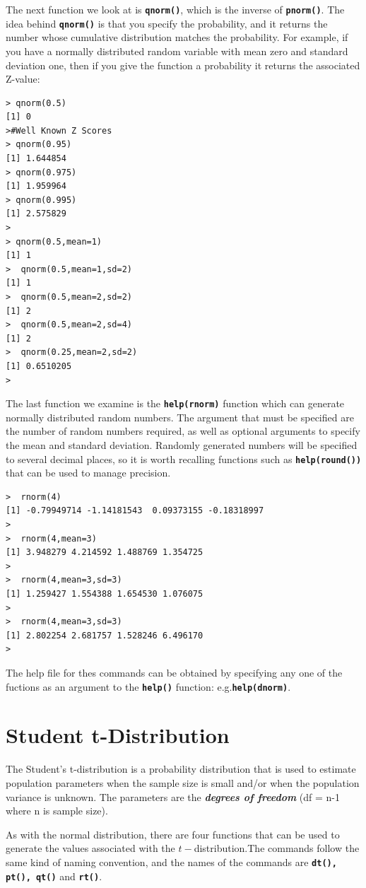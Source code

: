 \documentclass[a4paper,12pt]{article}
\begin{document}
The next function we look at is \texttt{\textbf{qnorm()}}, which is the inverse of \texttt{\textbf{pnorm()}}. The idea behind \texttt{\textbf{qnorm()}} is that you specify the probability, and it returns the number whose cumulative distribution matches the probability. 
For example, if you have a normally distributed random variable with mean zero and standard deviation one, then if you give the function a probability it returns the associated Z-value:


\begin{verbatim}
> qnorm(0.5)
[1] 0
>#Well Known Z Scores
> qnorm(0.95)
[1] 1.644854
> qnorm(0.975)
[1] 1.959964
> qnorm(0.995)
[1] 2.575829
>
> qnorm(0.5,mean=1)
[1] 1
>  qnorm(0.5,mean=1,sd=2)
[1] 1
>  qnorm(0.5,mean=2,sd=2)
[1] 2
>  qnorm(0.5,mean=2,sd=4)
[1] 2
>  qnorm(0.25,mean=2,sd=2)
[1] 0.6510205
> 
\end{verbatim}

The last function we examine is the  \textbf{\texttt{help(rnorm)}} function which can generate normally distributed random numbers. The argument that must be specified are the number of random numbers required, as well as optional arguments to specify the mean and standard deviation. Randomly generated numbers will be specified to several decimal places, so it is worth recalling functions such as \textbf{\texttt{help(round())}} that can be used to manage precision.
\begin{verbatim}
>  rnorm(4)
[1] -0.79949714 -1.14181543  0.09373155 -0.18318997
>
>  rnorm(4,mean=3)
[1] 3.948279 4.214592 1.488769 1.354725
>
>  rnorm(4,mean=3,sd=3)
[1] 1.259427 1.554388 1.654530 1.076075
> 
>  rnorm(4,mean=3,sd=3)
[1] 2.802254 2.681757 1.528246 6.496170
> 
\end{verbatim}

The help file for thes commands can be obtained by specifying any one of the fuctions as an argument to the \textbf{\texttt{help()}} function: e.g.\textbf{\texttt{help(dnorm)}}.
\newpage
\section{Student t-Distribution}
The Student’s t-distribution is a probability distribution that is used to estimate population parameters when the sample size is small and/or when the population variance is unknown.
The parameters are the \textbf{\textit{degrees of freedom}} (df = n-1 where n is sample size).

As with the normal distribution, there are four functions that can be used to generate the values associated with the $t-$distribution.The commands follow the same kind of naming convention, and the names of the commands are \texttt{\textbf{dt(), pt(), qt()}} and \texttt{\textbf{rt()}}.
\end{document}
